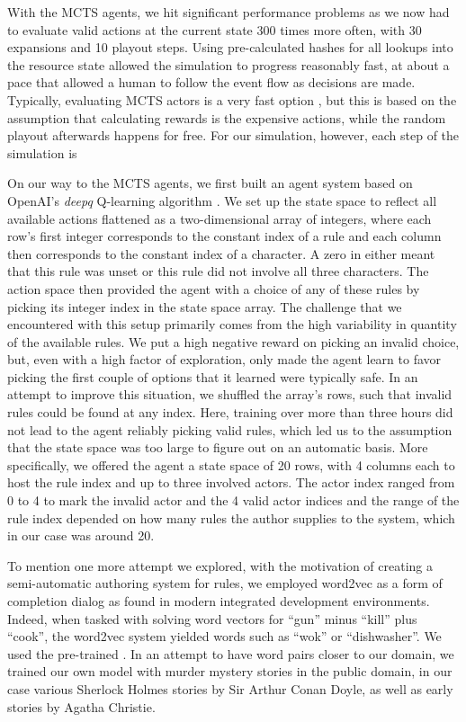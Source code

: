 With the MCTS agents, we hit significant performance problems as we now had to evaluate valid actions at the current state 300 times more often, with 30 expansions and 10 playout steps. Using pre-calculated hashes for all lookups into the resource state allowed the simulation to progress reasonably fast, at about a pace that allowed a human to follow the event flow as decisions are made. Typically, evaluating MCTS actors is a very fast option , but this is based on the assumption that calculating rewards is the expensive actions, while the random playout afterwards happens for free. For our simulation, however, each step of the simulation is

On our way to the MCTS agents, we first built an agent system based on OpenAI's \emph{deepq} Q-learning algorithm . We set up the state space to reflect all available actions flattened as a two-dimensional array of integers, where each row's first integer corresponds to the constant index of a rule and each column then corresponds to the constant index of a character. A zero in either meant that this rule was unset or this rule did not involve all three characters. The action space then provided the agent with a choice of any of these rules by picking its integer index in the state space array. The challenge that we encountered with this setup primarily comes from the high variability in quantity of the available rules. We put a high negative reward on picking an invalid choice, but, even with a high factor of exploration, only made the agent learn to favor picking the first couple of options that it learned were typically safe. In an attempt to improve this situation, we shuffled the array's rows, such that invalid rules could be found at any index. Here, training over more than three hours did not lead to the agent reliably picking valid rules, which led us to the assumption that the state space was too large to figure out on an automatic basis. More specifically, we offered the agent a state space of 20 rows, with 4 columns each to host the rule index and up to three involved actors. The actor index ranged from 0 to 4 to mark the invalid actor and the 4 valid actor indices and the range of the rule index depended on how many rules the author supplies to the system, which in our case was around 20.

To mention one more attempt we explored, with the motivation of creating a semi-automatic authoring system for rules, we employed word2vec  as a form of completion dialog as found in modern integrated development environments.
Indeed, when tasked with solving word vectors for \enquote{gun} minus \enquote{kill} plus \enquote{cook}, the word2vec system yielded words such as \enquote{wok} or \enquote{dishwasher}.
We used the pre-trained .
In an attempt to have word pairs closer to our domain, we trained our own model with murder mystery stories in the public domain, in our case various Sherlock Holmes stories by Sir Arthur Conan Doyle, as well as early stories by Agatha Christie.

